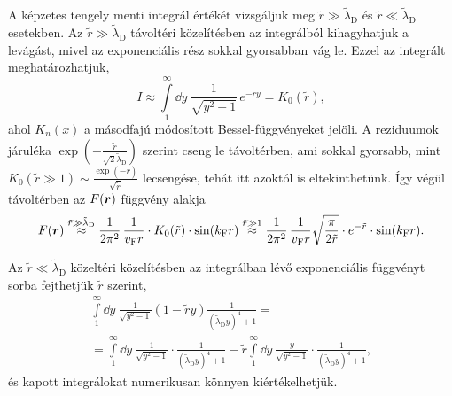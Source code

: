 \documentclass[a4paper,12pt,titlepage]{article}
\newcommand{\RR}{{\vb*{r}}}
\newcommand{\kF}{{k_\text{F}}}
\newcommand{\vF}{{v_\text{F}}}
\begin{document}
A képzetes tengely menti integrál értékét vizsgáljuk meg $\tilde{r} \gg \tilde{\lambda}_\text{D}$ és $\tilde{r} \ll \tilde{\lambda}_\text{D}$ esetekben.  Az $\tilde{r} \gg \tilde{\lambda}_\text{D}$ távoltéri közelítésben az integrálból kihagyhatjuk a levágást, mivel az exponenciális rész sokkal gyorsabban vág le.  Ezzel az integrált meghatározhatjuk,
\begin{equation}
	I \approx \int\limits_1^\infty \dd{y} ~ \frac{1}{\sqrt{y^2 - 1}} \, e^{-\tilde{r} y} = K_0(\tilde{r}),
\end{equation}
ahol $K_n(x)$ a másodfajú módosított Bessel-függvényeket jelöli.  A reziduumok járuléka $\exp(-\frac{\tilde{r}}{\sqrt{2} \tilde{\lambda}_\text{D}})$ szerint cseng le távoltérben, ami sokkal gyorsabb, mint $K_0(\tilde{r} \gg 1) \sim \frac{\exp(-\tilde{r})}{\sqrt{\tilde{r}}}$ lecsengése, tehát itt azoktól is eltekinthetünk.  Így végül távoltérben az $F(\RR)$ függvény alakja
\begin{equation}
	F(\RR) \stackrel{\tilde{r} \gg \tilde{\lambda}_\text{D}}{\approx} \frac{1}{2 \pi^2} \, \frac{1}{\vF r} \cdot K_0(\tilde{r}) \cdot \sin(\kF r) \stackrel{\tilde{r} \gg 1}{\approx} \frac{1}{2 \pi^2} \, \frac{1}{\vF r} \sqrt{\frac{\pi}{2 \tilde{r}}} \cdot e^{-\tilde{r}} \cdot \sin(\kF r).
\end{equation}

Az $\tilde{r} \ll \tilde{\lambda}_\text{D}$ közeltéri közelítésben az integrálban lévő exponenciális függvényt sorba fejthetjük $\tilde{r}$ szerint,
\begin{multline} \label{f-near-field}
	\int\limits_1^\infty \dd{y} ~ \frac{1}{\sqrt{y^2 - 1}} \left( 1 - \tilde{r} y \right) \frac{1}{\left( \tilde{\lambda}_\text{D} y \right)^4 + 1} = \\
	= \int\limits_1^\infty \dd{y} ~ \frac{1}{\sqrt{y^2 - 1}} \cdot \frac{1}{\left( \tilde{\lambda}_\text{D} y \right)^4 + 1} - \tilde{r} \int\limits_1^\infty \dd{y} ~ \frac{y}{\sqrt{y^2 - 1}} \cdot \frac{1}{\left( \tilde{\lambda}_\text{D} y \right)^4 + 1},
\end{multline}
és kapott integrálokat numerikusan könnyen kiértékelhetjük.
\end{document}
